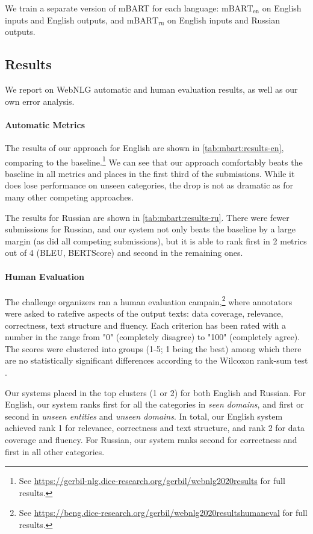 We train a separate version of mBART for each language: $\text{mBART}_{\text{en}}$ on English inputs and English outputs, and $\text{mBART}_{\text{ru}}$ on English inputs and Russian outputs.


\subsection{Results}
We report on WebNLG automatic and human evaluation results, as well as our own error analysis.

\paragraph{Automatic Metrics}
The results of our approach for English are shown in \autoref{tab:mbart:results-en}, comparing to the baseline.\footnote{See \url{https://gerbil-nlg.dice-research.org/gerbil/webnlg2020results} for full results.} We can see that our approach comfortably beats the baseline in all metrics and places in the first third of the submissions. While it does lose performance on unseen categories, the drop is not as dramatic as for many other competing approaches.

The results for Russian are shown in \autoref{tab:mbart:results-ru}. There were fewer submissions for Russian, and our system not only beats the baseline by a large margin (as did all competing submissions), but it is able to rank first in 2 metrics out of 4 (BLEU, BERTScore) and second in the remaining ones.

\paragraph{Human Evaluation}

The challenge organizers ran a human evaluation campain,\footnote{See \url{https://beng.dice-research.org/gerbil/webnlg2020resultshumaneval} for full results.} where annotators were asked to ratefive aspects of the output texts: data coverage, relevance, correctness, text structure and fluency.  Each criterion has been rated with a number in the range from "0" (completely disagree) to "100" (completely agree). The scores were clustered into groups (1-5; 1 being the best) among which there are no statistically significant differences according to the Wilcoxon rank-sum test \citep{wilcoxon1992individual}.

Our systems placed in the top clusters (1 or 2) for both English and Russian. For English, our system ranks first for all the categories in \textit{seen domains}, and first or second in \textit{unseen entities} and \textit{unseen domains}. In total, our English system achieved rank 1 for relevance, correctness and text structure, and rank 2 for data coverage and fluency. For Russian, our system ranks second for correctness and first in all other categories.


